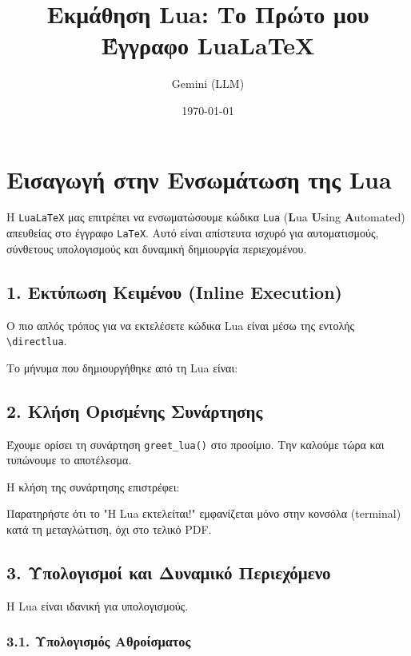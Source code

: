 \documentclass[11pt, a4paper]{article}
\title{Εκμάθηση Lua: Το Πρώτο μου Έγγραφο LuaLaTeX}
\author{Gemini (LLM)}
\date{\today}
\begin{document}
\maketitle

\section{Εισαγωγή στην Ενσωμάτωση της Lua}

Η \texttt{LuaLaTeX} μας επιτρέπει να ενσωματώσουμε κώδικα \texttt{Lua} (\textbf{L}ua \textbf{U}sing \textbf{A}utomated) απευθείας στο έγγραφο \texttt{LaTeX}. Αυτό είναι απίστευτα ισχυρό για αυτοματισμούς, σύνθετους υπολογισμούς και δυναμική δημιουργία περιεχομένου.

\subsection{1. Εκτύπωση Κειμένου (Inline Execution)}

Ο πιο απλός τρόπος για να εκτελέσετε κώδικα Lua είναι μέσω της εντολής \texttt{\textbackslash directlua}.

\noindent Το μήνυμα που δημιουργήθηκε από τη Lua είναι: 

\subsection{2. Κλήση Ορισμένης Συνάρτησης}

Έχουμε ορίσει τη συνάρτηση \texttt{greet\_lua()} στο προοίμιο. Την καλούμε τώρα και τυπώνουμε το αποτέλεσμα.

\noindent Η κλήση της συνάρτησης επιστρέφει: 
\smallskip

\noindent Παρατηρήστε ότι το "Η Lua εκτελείται!" εμφανίζεται μόνο στην κονσόλα (terminal) κατά τη μεταγλώττιση, όχι στο τελικό PDF.

\subsection{3. Υπολογισμοί και Δυναμικό Περιεχόμενο}

Η Lua είναι ιδανική για υπολογισμούς.

\subsubsection{3.1. Υπολογισμός Αθροίσματος}
\end{document}

